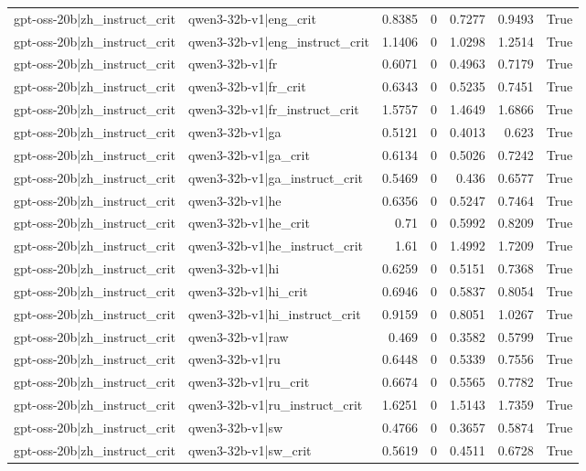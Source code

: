 \begin{table}
\begin{tabular}{l l r r r r l}
gpt-oss-20b|zh_instruct_crit & qwen3-32b-v1|eng_crit & 0.8385 & 0 & 0.7277 & 0.9493 & True \\
gpt-oss-20b|zh_instruct_crit & qwen3-32b-v1|eng_instruct_crit & 1.1406 & 0 & 1.0298 & 1.2514 & True \\
gpt-oss-20b|zh_instruct_crit & qwen3-32b-v1|fr & 0.6071 & 0 & 0.4963 & 0.7179 & True \\
gpt-oss-20b|zh_instruct_crit & qwen3-32b-v1|fr_crit & 0.6343 & 0 & 0.5235 & 0.7451 & True \\
gpt-oss-20b|zh_instruct_crit & qwen3-32b-v1|fr_instruct_crit & 1.5757 & 0 & 1.4649 & 1.6866 & True \\
gpt-oss-20b|zh_instruct_crit & qwen3-32b-v1|ga & 0.5121 & 0 & 0.4013 & 0.623 & True \\
gpt-oss-20b|zh_instruct_crit & qwen3-32b-v1|ga_crit & 0.6134 & 0 & 0.5026 & 0.7242 & True \\
gpt-oss-20b|zh_instruct_crit & qwen3-32b-v1|ga_instruct_crit & 0.5469 & 0 & 0.436 & 0.6577 & True \\
gpt-oss-20b|zh_instruct_crit & qwen3-32b-v1|he & 0.6356 & 0 & 0.5247 & 0.7464 & True \\
gpt-oss-20b|zh_instruct_crit & qwen3-32b-v1|he_crit & 0.71 & 0 & 0.5992 & 0.8209 & True \\
gpt-oss-20b|zh_instruct_crit & qwen3-32b-v1|he_instruct_crit & 1.61 & 0 & 1.4992 & 1.7209 & True \\
gpt-oss-20b|zh_instruct_crit & qwen3-32b-v1|hi & 0.6259 & 0 & 0.5151 & 0.7368 & True \\
gpt-oss-20b|zh_instruct_crit & qwen3-32b-v1|hi_crit & 0.6946 & 0 & 0.5837 & 0.8054 & True \\
gpt-oss-20b|zh_instruct_crit & qwen3-32b-v1|hi_instruct_crit & 0.9159 & 0 & 0.8051 & 1.0267 & True \\
gpt-oss-20b|zh_instruct_crit & qwen3-32b-v1|raw & 0.469 & 0 & 0.3582 & 0.5799 & True \\
gpt-oss-20b|zh_instruct_crit & qwen3-32b-v1|ru & 0.6448 & 0 & 0.5339 & 0.7556 & True \\
gpt-oss-20b|zh_instruct_crit & qwen3-32b-v1|ru_crit & 0.6674 & 0 & 0.5565 & 0.7782 & True \\
gpt-oss-20b|zh_instruct_crit & qwen3-32b-v1|ru_instruct_crit & 1.6251 & 0 & 1.5143 & 1.7359 & True \\
gpt-oss-20b|zh_instruct_crit & qwen3-32b-v1|sw & 0.4766 & 0 & 0.3657 & 0.5874 & True \\
gpt-oss-20b|zh_instruct_crit & qwen3-32b-v1|sw_crit & 0.5619 & 0 & 0.4511 & 0.6728 & True \\

\end{tabular}
\end{table}
